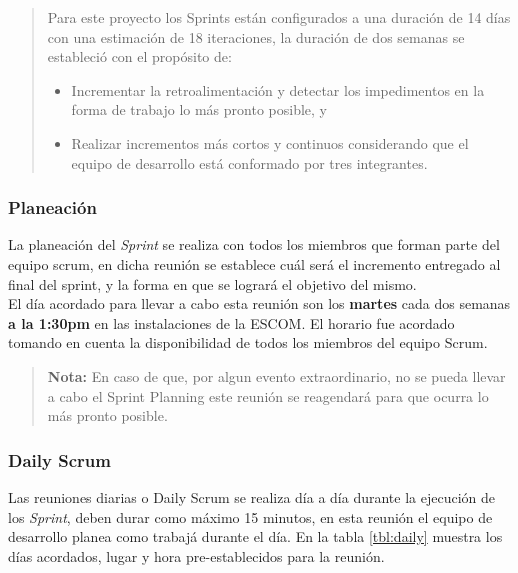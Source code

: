  \begin{quote}
    \noindent Para este proyecto los Sprints están configurados a una duración de 14 días con una
    estimación de 18 iteraciones, la duración de dos semanas se estableció con el propósito de:
    
    \begin{itemize}
        \item Incrementar la retroalimentación y detectar los impedimentos
              en la forma de trabajo lo más pronto posible, y

        \item Realizar incrementos más cortos y continuos considerando que el
              equipo de desarrollo está conformado por tres integrantes.
    \end{itemize} 
 \end{quote}
    
\subsubsection{Planeación}

 La planeación del {\it Sprint} se realiza con todos los miembros que forman parte del equipo scrum,
 en dicha reunión se establece cuál será el incremento entregado al final del sprint, y la forma
 en que se logrará el objetivo del mismo.\\

 \noindent El día acordado para llevar a cabo esta reunión son los {\bf martes} cada dos semanas
 {\bf a la 1:30pm} en las instalaciones de la ESCOM. El horario fue acordado tomando en cuenta
 la disponibilidad de todos los miembros del equipo Scrum.
    
    \begin{quote}
    {\bf Nota:} En caso de que, por algun evento extraordinario, no se pueda
                llevar a cabo el Sprint Planning este reunión se reagendará para
                que ocurra lo más pronto posible.
    \end{quote}
  
\subsubsection{Daily Scrum}

 Las reuniones diarias o Daily Scrum se realiza día a día durante la ejecución de los {\it Sprint}, deben
 durar como máximo 15 minutos, en esta reunión el equipo de desarrollo planea como trabajá durante el día.
 En la tabla \ref{tbl:daily} muestra los días acordados, lugar y hora pre-establecidos para la reunión.

